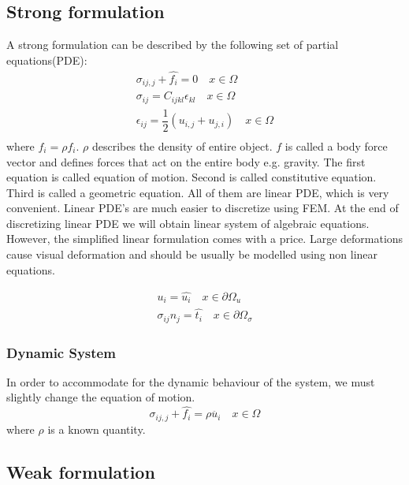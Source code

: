 \documentclass[en]{minipw} %
\begin{document}
\subsection{Strong formulation}
A strong formulation can be described by the following set of partial  equations(PDE):
\begin{equation}
\begin{aligned}
\sigma_{ij,j} + \hat{f_{i}} = 0 \quad x \in \Omega
\\
\sigma_{ij} = C_{ijkl} \epsilon_{kl} \quad x \in \Omega
\\
\epsilon_{ij} = \dfrac{1}{2}(u_{i,j} + u_{j,i}) \quad x \in \Omega
\\
\end{aligned}
\end{equation}
where $\hat{f_{i}} = \rho f_i$. $\rho$ describes the density of entire object. $f$ is called a body force vector and defines forces that act on the entire body e.g. gravity. The first equation is called equation of motion. Second is called constitutive equation. Third is called a geometric equation. All of them are linear  PDE, which is very convenient. Linear PDE's are much easier to discretize using FEM. At the end of discretizing linear PDE we will obtain linear system of algebraic equations. However, the simplified linear formulation comes with a price. Large deformations cause visual deformation and should be usually be modelled using non linear equations.

\begin{equation}
\begin{aligned}
u_i = \hat{u_i} \quad x \in \partial  \Omega_{u}
\\
\sigma_{ij} n_{j} = \hat{t_i} \quad x \in \partial \Omega_{\sigma}
\end{aligned}
\end{equation}

\subsubsection{Dynamic System}
In order to accommodate for the dynamic behaviour of the system, we must slightly change the equation of motion.
\begin{equation}
\label{eq:motion_dynamic}
\sigma_{ij,j} + \hat{f_{i}} = \rho \ddot{u_i} \quad x \in \Omega
\end{equation}
where $\rho$ is a known quantity.

\subsection{Weak formulation}
\end{document}
